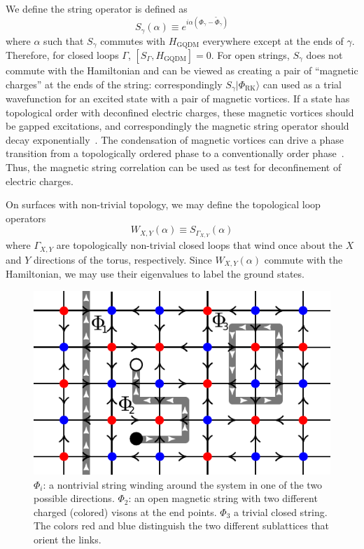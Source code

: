 \documentclass[twocolumn,prb,aps,floatfix,superscriptaddress]{revtex4-1}
\newcommand{\ket}[1]{| #1 \rangle}
\newcommand{\RK}{\mathrm{RK}}
\newcommand{\HGQDM}{H_\mathrm{GQDM}}
\begin{document}
We define the string operator is defined as
\begin{equation}
S_\gamma \left( \alpha \right) \equiv e^{i \alpha \left( \Phi_\gamma - \tilde{\Phi}_\gamma \right)} \label{eq:Sgamma}
\end{equation}
where $\alpha$ such that $S_\gamma$ commutes with $\HGQDM$ everywhere except at the ends of $\gamma$. Therefore, for closed loops $\Gamma$, $[ S_\Gamma,\HGQDM]=0$. For open strings, $S_\gamma$ does not commute with the Hamiltonian and can be viewed as creating a pair of ``magnetic charges'' at the ends of the string: correspondingly $S_\gamma \ket{\Phi_{\RK}}$ can used as a trial wavefunction for an excited state with a pair of magnetic vortices. If a state has topological order with deconfined electric charges, these magnetic vortices should be gapped excitations, and correspondingly the magnetic string operator should decay exponentially~\cite{Read1989a,Senthil2000,Senthil2001e}. The condensation of magnetic vortices can drive a phase transition from a topologically ordered phase to a conventionally order phase~\cite{Jalabert1991,Ralko2007,Huh2011}. Thus, the magnetic string correlation can be used as test for deconfinement of electric charges.

On surfaces with non-trivial topology, we may define the topological loop operators
\begin{equation}
W_{X,Y} \left( \alpha \right) \equiv S_{\Gamma_{X,Y}} \left( \alpha \right)
\end{equation}
where $\Gamma_{X,Y}$ are topologically non-trivial closed loops that wind once about the $X$ and $Y$ directions of the torus, respectively. Since $W_{X,Y} (\alpha)$ commute with the Hamiltonian, we may use their eigenvalues to label the ground states.

\begin{figure}[tpb]
    \centering
    \includegraphics[width=1.0\columnwidth]{mag_loops_on_orntd_lat.pdf}
    \caption{$\Phi_i$: a nontrivial string winding around the system in one of the two possible
        directions. $\Phi_2$: an open
    magnetic string with two different charged (colored) visons at the end points. $\Phi_3$ a trivial closed
    string. The colors red and blue distinguish the two different sublattices that orient the links.}
    \label{fig:orientedSL}
\end{figure}
\end{document}
